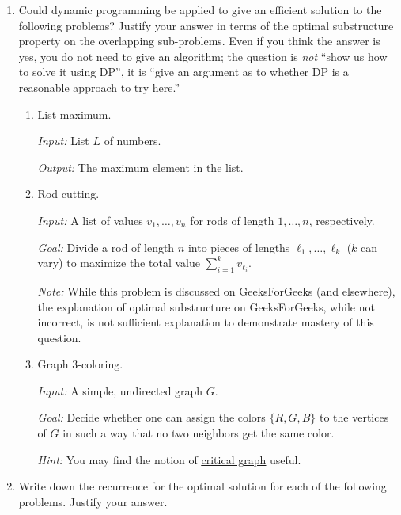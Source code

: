 \documentclass[12pt]{article}
\begin{document}
\begin{enumerate}

\item \label{1} Could dynamic programming be applied to give an efficient solution to the following problems? Justify your answer in terms of the optimal substructure property on the overlapping sub-problems. Even if you think the answer is yes, you do not need to give an algorithm; the question is \emph{not} ``show us how to solve it using DP'', it is ``give an argument as to whether DP is a reasonable approach to try here.''

\begin{enumerate}
\item \label{1a} List maximum.

\textit{Input:} List $L$ of numbers.

\textit{Output:} The maximum element in the list.

\pagebreak

\item \label{1b} Rod cutting.

\textit{Input:} A list of values $v_1, \dotsc, v_n$ for rods of length $1, \dotsc, n$, respectively. 

\textit{Goal:} Divide a rod of length $n$ into pieces of lengths $\ell_1, \dotsc, \ell_k$ ($k$ can vary) to maximize the total value $\sum_{i=1}^{k} v_{\ell_i}$.

\textit{Note:} While this problem is discussed on GeeksForGeeks (and elsewhere), the explanation of optimal substructure on GeeksForGeeks, while not incorrect, is not sufficient explanation to demonstrate mastery of this question.

\pagebreak

\item \label{1c} Graph 3-coloring. 

\textit{Input:} A simple, undirected graph $G$.

\textit{Goal:} Decide whether one can assign the colors $\{R,G,B\}$ to the vertices of $G$ in such a way that no two neighbors get the same color.

\textit{Hint:} You may find the notion of {\color{blue} \href{https://en.wikipedia.org/wiki/Critical_graph}{\underline{critical graph}}} useful.

\pagebreak

\end{enumerate}

\item \label{2} Write down the recurrence for the optimal solution for each of the following problems. Justify your answer.


\end{enumerate}
\end{document}
